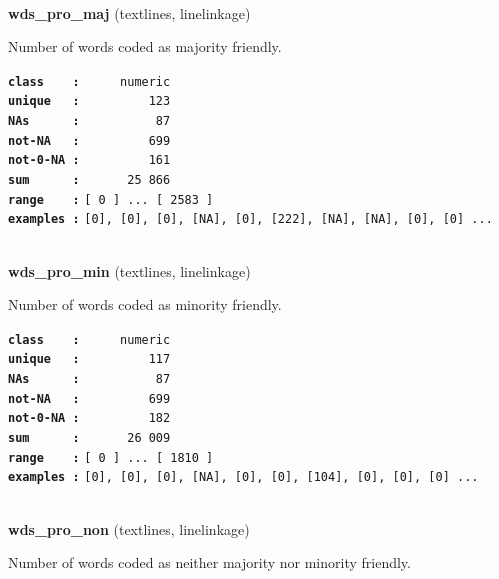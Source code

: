 \documentclass[]{article}
\begin{document}
~

\textbf{wds\_pro\_maj} (textlines, linelinkage)

Number of words coded as majority friendly.

\textbf{\texttt{class\ \ \ \ :}} \texttt{~~~~~numeric}\\
\textbf{\texttt{unique\ \ \ :}} \texttt{~~~~~~~~~123}\\
\textbf{\texttt{NAs\ \ \ \ \ \ :}} \texttt{~~~~~~~~~~87}\\
\textbf{\texttt{not-NA\ \ \ :}} \texttt{~~~~~~~~~699}\\
\textbf{\texttt{not-0-NA\ :}} \texttt{~~~~~~~~~161}\\
\textbf{\texttt{sum\ \ \ \ \ \ :}} \texttt{~~~~~~25~866}\\
\textbf{\texttt{range\ \ \ \ :}}
\texttt{{[}\ 0\ {]}\ ...\ {[}\ 2583\ {]}}\\
\textbf{\texttt{examples\ :}}
\texttt{{[}0{]},\ {[}0{]},\ {[}0{]},\ {[}NA{]},\ {[}0{]},\ {[}222{]},\ {[}NA{]},\ {[}NA{]},\ {[}0{]},\ {[}0{]}\ ...}\\

~

\textbf{wds\_pro\_min} (textlines, linelinkage)

Number of words coded as minority friendly.

\textbf{\texttt{class\ \ \ \ :}} \texttt{~~~~~numeric}\\
\textbf{\texttt{unique\ \ \ :}} \texttt{~~~~~~~~~117}\\
\textbf{\texttt{NAs\ \ \ \ \ \ :}} \texttt{~~~~~~~~~~87}\\
\textbf{\texttt{not-NA\ \ \ :}} \texttt{~~~~~~~~~699}\\
\textbf{\texttt{not-0-NA\ :}} \texttt{~~~~~~~~~182}\\
\textbf{\texttt{sum\ \ \ \ \ \ :}} \texttt{~~~~~~26~009}\\
\textbf{\texttt{range\ \ \ \ :}}
\texttt{{[}\ 0\ {]}\ ...\ {[}\ 1810\ {]}}\\
\textbf{\texttt{examples\ :}}
\texttt{{[}0{]},\ {[}0{]},\ {[}0{]},\ {[}NA{]},\ {[}0{]},\ {[}0{]},\ {[}104{]},\ {[}0{]},\ {[}0{]},\ {[}0{]}\ ...}\\

~

\textbf{wds\_pro\_non} (textlines, linelinkage)

Number of words coded as neither majority nor minority friendly.
\end{document}

